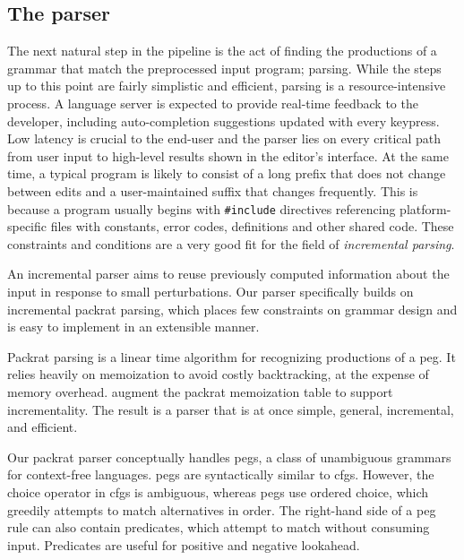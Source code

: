 \subsection{The parser}

The next natural step in the pipeline is the act of finding the productions of a
\pfs grammar that match the preprocessed input program; parsing. While the steps
up to this point are fairly simplistic and efficient, parsing is a
resource-intensive process. A language server is expected to provide real-time
feedback to the developer, including auto-completion suggestions updated with
every keypress. Low latency is crucial to the end-user and the parser lies on
every critical path from user input to high-level results shown in the editor's
interface. At the same time, a typical \pfs program is likely to consist of a
long prefix that does not change between edits and a user-maintained suffix that
changes frequently. This is because a \pfs program usually begins with
\texttt{\#include} directives referencing platform-specific files with
constants, error codes, \extern{} definitions and other shared code. These
constraints and conditions are a very good fit for the field of
\emph{incremental parsing}.

An incremental parser aims to reuse previously computed information about the
input in response to small perturbations. Our parser specifically builds on
incremental packrat parsing\cite{dubroy2017incremental-packrat-parsing}, which
places few constraints on grammar design and is easy to implement in an
extensible manner.

Packrat parsing\cite{ford2002packrat} is a linear time algorithm for recognizing
productions of a \acrfull{peg}. It relies heavily on memoization to avoid costly
backtracking, at the expense of memory overhead.
 augment the packrat
memoization table to support incrementality. The result is a parser that is at
once simple, general, incremental, and efficient.

Our packrat parser conceptually handles \acrlong{peg}s\cite{ford2004parsing}, a
class of unambiguous grammars for context-free languages. \acrshort{peg}s are
syntactically similar to \acrlong{cfg}s. However, the choice operator in
\acrshort{cfg}s is ambiguous, whereas \acrshort{peg}s use ordered choice, which
greedily attempts to match alternatives in order. The right-hand side of a
\acrlong{peg} rule can also contain predicates, which attempt to match without
consuming input. Predicates are useful for positive and negative look\-ahead.

